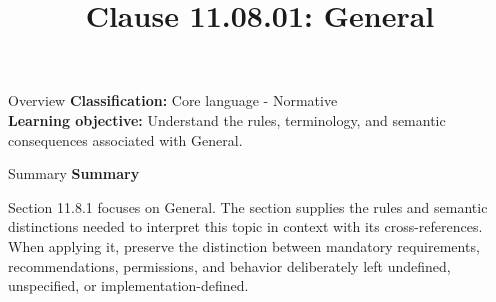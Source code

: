 \documentclass[10pt,letterpaper]{article}
\title{Clause 11.08.01: General}
\author{}
\date{}
\begin{document}
\maketitle
\begin{CornellOverviewBox}{Overview}
\textbf{Classification:} Core language - Normative\\[2pt]
\textbf{Learning objective:} Understand the rules, terminology, and semantic consequences associated with General.
\end{CornellOverviewBox}\begin{CornellSummaryBox}{Summary}
{\sffamily\bfseries\color{Accent} Summary}\par\vspace{3pt}Section 11.8.1 focuses on General. The section supplies the rules and semantic distinctions needed to interpret this topic in context with its cross-references. When applying it, preserve the distinction between mandatory requirements, recommendations, permissions, and behavior deliberately left undefined, unspecified, or implementation-defined.
\end{CornellSummaryBox}
\end{document}

